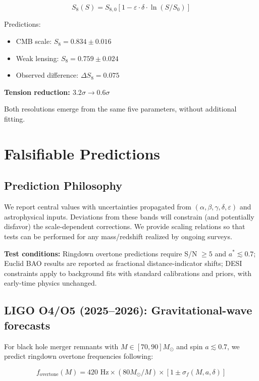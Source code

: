 \begin{equation}
S_8(S) = S_{8,0}[1 - \varepsilon \cdot \delta \cdot \ln(S/S_0)]
\end{equation}

Predictions:

\begin{itemize}
\item CMB scale: $S_8 = 0.834 \pm 0.016$
\item Weak lensing: $S_8 = 0.759 \pm 0.024$
\item Observed difference: $\Delta S_8 = 0.075$
\end{itemize}

\textbf{Tension reduction: $3.2\sigma \to 0.6\sigma$}

Both resolutions emerge from the same five parameters, without additional fitting.

\section{Falsifiable Predictions}

\subsection{Prediction Philosophy}

We report central values with uncertainties propagated from $(\alpha, \beta, \gamma, \delta, \varepsilon)$ and astrophysical inputs. Deviations from these bands will constrain (and potentially disfavor) the scale-dependent corrections. We provide scaling relations so that tests can be performed for any mass/redshift realized by ongoing surveys.

\textbf{Test conditions:} Ringdown overtone predictions require S/N $\geq 5$ and $a^* \lesssim 0.7$; Euclid BAO results are reported as fractional distance-indicator shifts; DESI constraints apply to background fits with standard calibrations and priors, with early-time physics unchanged.

\subsection{LIGO O4/O5 (2025--2026): Gravitational-wave forecasts}

For black hole merger remnants with $M \in [70,90] M_\odot$ and spin $a \lesssim 0.7$, we predict ringdown overtone frequencies following:

\begin{equation}
f_{\text{overtone}}(M) = 420 \text{ Hz} \times (80 M_\odot/M) \times [1 \pm \sigma_f(M,a,\delta)]
\end{equation}

